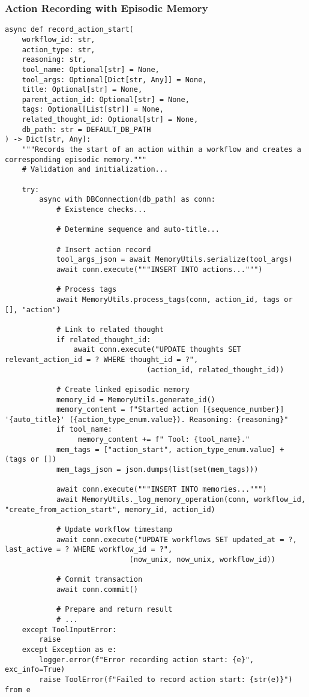 \documentclass[12pt,a4paper]{article}
\begin{document}
\subsubsection*{Action Recording with Episodic Memory}
\begin{pageablecode}
\begin{verbatim}
async def record_action_start(
    workflow_id: str,
    action_type: str,
    reasoning: str,
    tool_name: Optional[str] = None,
    tool_args: Optional[Dict[str, Any]] = None,
    title: Optional[str] = None,
    parent_action_id: Optional[str] = None,
    tags: Optional[List[str]] = None,
    related_thought_id: Optional[str] = None,
    db_path: str = DEFAULT_DB_PATH
) -> Dict[str, Any]:
    """Records the start of an action within a workflow and creates a corresponding episodic memory."""
    # Validation and initialization...

    try:
        async with DBConnection(db_path) as conn:
            # Existence checks...

            # Determine sequence and auto-title...

            # Insert action record
            tool_args_json = await MemoryUtils.serialize(tool_args)
            await conn.execute("""INSERT INTO actions...""")

            # Process tags
            await MemoryUtils.process_tags(conn, action_id, tags or [], "action")

            # Link to related thought
            if related_thought_id:
                await conn.execute("UPDATE thoughts SET relevant_action_id = ? WHERE thought_id = ?",
                                 (action_id, related_thought_id))

            # Create linked episodic memory
            memory_id = MemoryUtils.generate_id()
            memory_content = f"Started action [{sequence_number}] '{auto_title}' ({action_type_enum.value}). Reasoning: {reasoning}"
            if tool_name:
                 memory_content += f" Tool: {tool_name}."
            mem_tags = ["action_start", action_type_enum.value] + (tags or [])
            mem_tags_json = json.dumps(list(set(mem_tags)))

            await conn.execute("""INSERT INTO memories...""")
            await MemoryUtils._log_memory_operation(conn, workflow_id, "create_from_action_start", memory_id, action_id)

            # Update workflow timestamp
            await conn.execute("UPDATE workflows SET updated_at = ?, last_active = ? WHERE workflow_id = ?",
                             (now_unix, now_unix, workflow_id))

            # Commit transaction
            await conn.commit()

            # Prepare and return result
            # ...
    except ToolInputError:
        raise
    except Exception as e:
        logger.error(f"Error recording action start: {e}", exc_info=True)
        raise ToolError(f"Failed to record action start: {str(e)}") from e
\end{verbatim}
\end{pageablecode}
\end{document}
